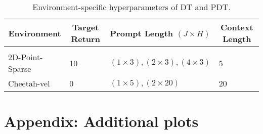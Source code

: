 \documentclass{article} %
\begin{document}
\begin{table*}[ht]
    \begin{center}
    \begin{tabular}{llll}
    \multicolumn{1}{c}{Environment}  &\multicolumn{1}{c}{Target Return} &\multicolumn{1}{c}{Prompt Length $(J \times H)$ } &\multicolumn{1}{c}{Context Length}
    \\ \hline \\
    2D-Point-Sparse & 10 & $(1 \times 3), (2 \times 3), (4 \times 3)$ & 5\\
    Cheetah-vel & 0 & $(1 \times 5), (2 \times 20)$ & 20 \\
    \end{tabular}
    \end{center}
    \caption{Environment-specific hyperparameters of DT and PDT.}
    \label{tab:pdt_hyperparameters_env}
\end{table*}



\section{Appendix: Additional plots}
\label{appx:additional_plots}
%
%
\end{document}
